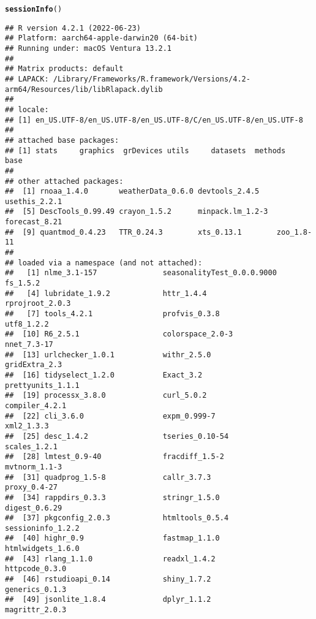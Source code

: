 \documentclass{article}\usepackage[]{graphicx}\usepackage[]{xcolor}
\makeatletter
\newcommand{\hlstd}[1]{\textcolor[rgb]{0.345,0.345,0.345}{#1}}%
\newcommand{\hlkwd}[1]{\textcolor[rgb]{0.737,0.353,0.396}{\textbf{#1}}}%
\newenvironment{kframe}{%
 \def\at@end@of@kframe{}%
 \ifinner\ifhmode%
  \def\at@end@of@kframe{\end{minipage}}%
  \begin{minipage}{\columnwidth}%
 \fi\fi%
 \def\FrameCommand##1{\hskip\@totalleftmargin \hskip-\fboxsep
 \colorbox{shadecolor}{##1}\hskip-\fboxsep
     \hskip-\linewidth \hskip-\@totalleftmargin \hskip\columnwidth}%
 \MakeFramed {\advance\hsize-\width
   \@totalleftmargin\z@ \linewidth\hsize
   \@setminipage}}%
 {\par\unskip\endMakeFramed%
 \at@end@of@kframe}
\newenvironment{knitrout}{}{} %
\makeatother
\begin{document}
\begin{knitrout}
\color{fgcolor}\begin{kframe}
\begin{alltt}
\hlkwd{sessionInfo}\hlstd{()}
\end{alltt}
\begin{verbatim}
## R version 4.2.1 (2022-06-23)
## Platform: aarch64-apple-darwin20 (64-bit)
## Running under: macOS Ventura 13.2.1
## 
## Matrix products: default
## LAPACK: /Library/Frameworks/R.framework/Versions/4.2-arm64/Resources/lib/libRlapack.dylib
## 
## locale:
## [1] en_US.UTF-8/en_US.UTF-8/en_US.UTF-8/C/en_US.UTF-8/en_US.UTF-8
## 
## attached base packages:
## [1] stats     graphics  grDevices utils     datasets  methods   base     
## 
## other attached packages:
##  [1] rnoaa_1.4.0       weatherData_0.6.0 devtools_2.4.5    usethis_2.2.1    
##  [5] DescTools_0.99.49 crayon_1.5.2      minpack.lm_1.2-3  forecast_8.21    
##  [9] quantmod_0.4.23   TTR_0.24.3        xts_0.13.1        zoo_1.8-11       
## 
## loaded via a namespace (and not attached):
##   [1] nlme_3.1-157               seasonalityTest_0.0.0.9000 fs_1.5.2                  
##   [4] lubridate_1.9.2            httr_1.4.4                 rprojroot_2.0.3           
##   [7] tools_4.2.1                profvis_0.3.8              utf8_1.2.2                
##  [10] R6_2.5.1                   colorspace_2.0-3           nnet_7.3-17               
##  [13] urlchecker_1.0.1           withr_2.5.0                gridExtra_2.3             
##  [16] tidyselect_1.2.0           Exact_3.2                  prettyunits_1.1.1         
##  [19] processx_3.8.0             curl_5.0.2                 compiler_4.2.1            
##  [22] cli_3.6.0                  expm_0.999-7               xml2_1.3.3                
##  [25] desc_1.4.2                 tseries_0.10-54            scales_1.2.1              
##  [28] lmtest_0.9-40              fracdiff_1.5-2             mvtnorm_1.1-3             
##  [31] quadprog_1.5-8             callr_3.7.3                proxy_0.4-27              
##  [34] rappdirs_0.3.3             stringr_1.5.0              digest_0.6.29             
##  [37] pkgconfig_2.0.3            htmltools_0.5.4            sessioninfo_1.2.2         
##  [40] highr_0.9                  fastmap_1.1.0              htmlwidgets_1.6.0         
##  [43] rlang_1.1.0                readxl_1.4.2               httpcode_0.3.0            
##  [46] rstudioapi_0.14            shiny_1.7.2                generics_0.1.3            
##  [49] jsonlite_1.8.4             dplyr_1.1.2                magrittr_2.0.3            

\end{verbatim}
\end{kframe}
\end{knitrout}
\end{document}
